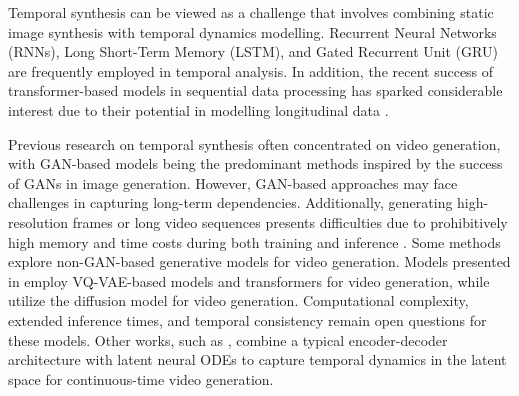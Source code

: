 Temporal synthesis can be viewed as a challenge that involves combining static image synthesis with temporal dynamics modelling. Recurrent Neural Networks (RNNs), Long Short-Term Memory (LSTM), and Gated Recurrent Unit (GRU) are frequently employed in temporal analysis. In addition, the recent success of transformer-based models in sequential data processing has sparked considerable interest due to their potential in modelling longitudinal data \cite{li2022hi}.


Previous research on temporal synthesis often concentrated on video generation, with GAN-based models being the predominant methods inspired by the success of GANs in image generation. However, GAN-based approaches may face challenges in capturing long-term dependencies. Additionally, generating high-resolution frames or long video sequences presents difficulties due to prohibitively high memory and time costs during both training and inference \cite{ge2022long}. Some methods explore non-GAN-based generative models for video generation. Models presented in \cite{yan2021videogpt,ge2022long,le2021ccvs} employ VQ-VAE-based models and transformers for video generation, while \cite{ho2022imagen,voleti2022mcvd} utilize the diffusion model for video generation. Computational complexity, extended inference times, and temporal consistency remain open questions for these models. Other works, such as \cite{kanaa2021simple,park2021vid,xia2022modelling}, combine a typical encoder-decoder architecture with latent neural ODEs to capture temporal dynamics in the latent space for continuous-time video generation. 

